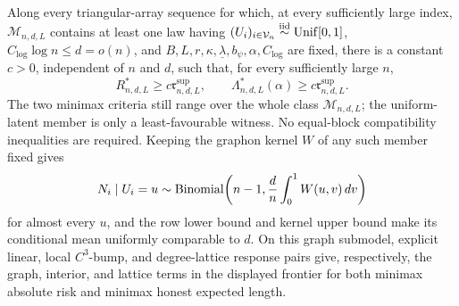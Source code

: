 Along every triangular-array sequence for which, at every sufficiently large index, \(\mathcal M_{n,d,L}\) contains at least one law having \((U_i)_{i\in\mathcal V_n}\overset{\mathrm{iid}}{\sim}{\rm Unif}[0,1]\), \(C_{\log}\log n\leq d=o(n)\), and \(B,L,r,\kappa,\underline\lambda,b_\psi,\alpha,C_{\log}\) are fixed, there is a constant \(c>0\), independent of \(n\) and \(d\), such that, for every sufficiently large \(n\),
\[
 R^*_{n,d,L}\geq c\mathfrak r^{\mathrm{sup}}_{n,d,L},
 \qquad
 \Lambda^*_{n,d,L}(\alpha)\geq c\mathfrak r^{\mathrm{sup}}_{n,d,L}.
\]
The two minimax criteria still range over the whole class \(\mathcal M_{n,d,L}\); the uniform-latent member is only a least-favourable witness.  No equal-block compatibility inequalities are required.  Keeping the graphon kernel \(W\) of any such member fixed gives
\[
 N_i\mid U_i=u\sim {\rm Binomial}\!\left(n-1,\frac dn\int_0^1W(u,v)\,dv\right)
\]
for almost every \(u\), and the row lower bound and kernel upper bound make its conditional mean uniformly comparable to \(d\).  On this graph submodel, explicit linear, local \(C^3\)-bump, and degree-lattice response pairs give, respectively, the graph, interior, and lattice terms in the displayed frontier for both minimax absolute risk and minimax honest expected length.